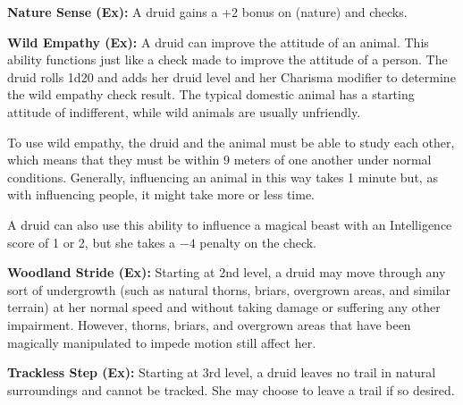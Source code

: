 

\textbf{Nature Sense (Ex):} A druid gains a +2 bonus on  (nature) and  checks.

\textbf{Wild Empathy (Ex):} A druid can improve the attitude of an animal. This ability functions just like a  check made to improve the attitude of a person. The druid rolls 1d20 and adds her druid level and her Charisma modifier to determine the wild empathy check result. The typical domestic animal has a starting attitude of indifferent, while wild animals are usually unfriendly.

To use wild empathy, the druid and the animal must be able to study each other, which means that they must be within 9 meters of one another under normal conditions. Generally, influencing an animal in this way takes 1 minute but, as with influencing people, it might take more or less time.

A druid can also use this ability to influence a magical beast with an Intelligence score of 1 or 2, but she takes a $-4$ penalty on the check.

\textbf{Woodland Stride (Ex):} Starting at 2nd level, a druid may move through any sort of undergrowth (such as natural thorns, briars, overgrown areas, and similar terrain) at her normal speed and without taking damage or suffering any other impairment. However, thorns, briars, and overgrown areas that have been magically manipulated to impede motion still affect her.

\textbf{Trackless Step (Ex):} Starting at 3rd level, a druid leaves no trail in natural surroundings and cannot be tracked. She may choose to leave a trail if so desired.

